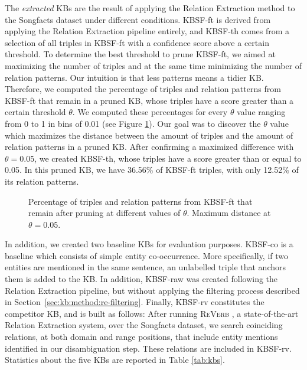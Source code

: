 The \textit{extracted} KBs are the result of applying the Relation Extraction method to the Songfacts dataset under different conditions. \textsc{KBSF}-ft is derived from applying the Relation Extraction pipeline entirely, and \textsc{KBSF}-th comes from a selection of all triples in \textsc{KBSF}-ft with a confidence score above a certain threshold. To determine the best threshold to prune \textsc{KBSF}-ft, we aimed at maximizing the number of triples and at the same time minimizing the number of relation patterns. Our intuition is that less patterns means a tidier KB. Therefore, we computed the percentage of triples and relation patterns from \textsc{KBSF}-ft that remain in a pruned KB, whose triples have a score greater than a certain threshold $\theta$. We computed these percentages for every $\theta$ value ranging from 0 to 1 in bins of 0.01 (see Figure \ref{fig:kb:th}). Our goal was to discover the $\theta$ value which maximizes the distance between the amount of triples and the amount of relation patterns in a pruned KB. After confirming a maximized difference with $\theta=0.05$, we created \textsc{KBSF}-th, whose triples have a score greater than or equal to 0.05. In this pruned KB, we have 36.56\% of \textsc{KBSF}-ft triples, with only 12.52\% of its relation patterns.

\begin{figure}[!htp]
\centerline{}
\caption[Percentage of triples and relation patterns from \textsc{KBSF}-ft.]{Percentage of triples and relation patterns from \textsc{KBSF}-ft that remain after pruning at different values of $\theta$. Maximum distance at $\theta=0.05$.}
\label{fig:kb:th}
\end{figure}

In addition, we created two baseline KBs for evaluation purposes. \textsc{KBSF}-co is a baseline which consists of simple entity co-occurrence. More specifically, if two entities are mentioned in the same sentence, an unlabelled triple that anchors them is added to the KB. In addition, \textsc{KBSF}-raw was created following the Relation Extraction pipeline, but without applying the filtering process described in Section~\ref{sec:kb:method:re-filtering}. Finally, \textsc{KBSF}-rv constitutes the competitor KB, and is built as follows: After running \textsc{ReVerb} \citep{Fader2011}, a state-of-the-art Relation Extraction system, over the Songfacts dataset, we search coinciding relations, at both domain and range positions, that include entity mentions identified in our disambiguation step. These relations are included in KBSF-rv. Statistics about the five KBs are reported in Table \ref{tab:kbs}.

